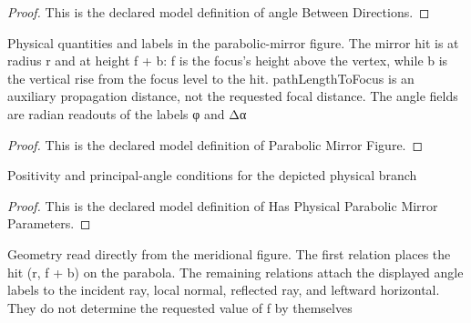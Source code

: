 \begin{proof}
  This is the declared model definition of angle Between Directions.
\end{proof}
\begin{definition}
  \label{def:physics:phyx-mini-0114:phyxminiproblems-problemphyxmini0114-parabolicmirrorfigure}
  Physical quantities and labels in the parabolic-mirror figure. The mirror hit is at radius r and at height f + b: f is the focus's height above the vertex, while b is the vertical rise from the focus level to the hit. pathLengthToFocus is an auxiliary propagation distance, not the requested focal distance. The angle fields are radian readouts of the labels φ and Δα
\end{definition}
\begin{proof}
  This is the declared model definition of Parabolic Mirror Figure.
\end{proof}
\begin{definition}
  \label{def:physics:phyx-mini-0114:phyxminiproblems-problemphyxmini0114-hasphysicalparabolicmirrorparameters}
  Positivity and principal-angle conditions for the depicted physical branch
\end{definition}
\begin{proof}
  This is the declared model definition of Has Physical Parabolic Mirror Parameters.
\end{proof}
\begin{definition}
  \label{def:physics:phyx-mini-0114:phyxminiproblems-problemphyxmini0114-matchesparabolicmirrorfigure}
  Geometry read directly from the meridional figure. The first relation places the hit (r, f + b) on the parabola. The remaining relations attach the displayed angle labels to the incident ray, local normal, reflected ray, and leftward horizontal. They do not determine the requested value of f by themselves
\end{definition}
